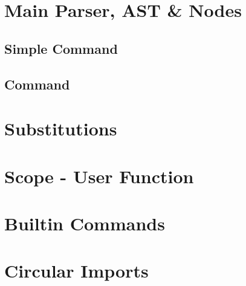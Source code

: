 \section{Main Parser, AST \& Nodes}

\subsection{Simple Command}
\subsection{Command}
\subsection{}

\section{Substitutions}

\section{Scope - User Function}

\section{Builtin Commands}

\section{Circular Imports}




